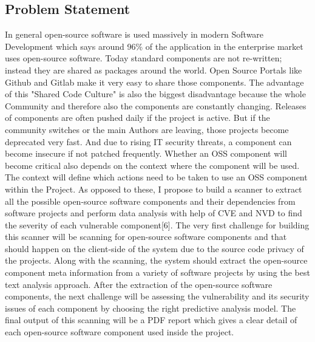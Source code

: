 \subsection{Problem Statement}
In general open-source software is used massively in modern Software Development which says around 96\% of the application in the enterprise market uses open-source software. Today standard components are not re-written; instead they are shared as packages around the world. Open Source Portals like Github and Gitlab make it very easy to share those components. The advantage of this "Shared Code Culture" is also the biggest disadvantage because the whole Community and therefore also the components are constantly changing. Releases of components are often pushed daily if the project is active. But if the community switches or the main Authors are leaving, those projects become deprecated very fast. And due to rising IT security threats, a component can become insecure if not patched frequently. Whether an \acs{OSS} component will become critical also depends on the context where the component will be used. The context will define which actions need to be taken to use an \acs{OSS} component within the Project.  As opposed to these, I propose to build a scanner to extract all the possible open-source software components and their dependencies from software projects and perform data analysis with help of \acs{CVE} and \acs{NVD} to find the severity of each vulnerable component[6]. The very first challenge for building this scanner will be scanning for open-source software components and that should happen on the client-side of the system due to the source code privacy of the projects. Along with the scanning, the system should extract the open-source component meta information from a variety of software projects by using the best text analysis approach. After the extraction of the open-source software components, the next challenge will be assessing the vulnerability and its security issues of each component by choosing the right predictive analysis model. The final output of this scanning will be a PDF report which gives a clear detail of each open-source software component used inside the project.